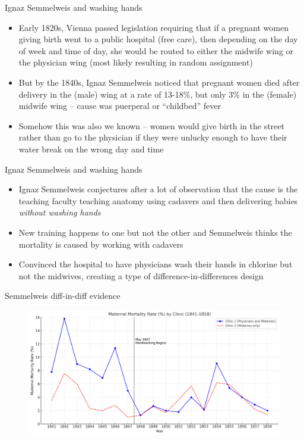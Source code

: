 \documentclass{beamer}
\begin{document}
\begin{frame}{Ignaz Semmelweis and washing hands}

\begin{itemize}
\item Early 1820s, Vienna passed legislation requiring that if a pregnant women giving birth went to a public hospital (free care), then depending on the day of week and time of day, she would be routed to either the midwife wing or the physician wing (most likely resulting in random assignment)
\item But by the 1840s, Ignaz Semmelweis noticed that pregnant women died after delivery in the (male) wing at a rate of 13-18\%, but only 3\% in the (female) midwife wing -- cause was puerperal or “childbed” fever
\item Somehow this was also we known -- women would give birth in the street rather than go to the physician if they were unlucky enough to have their water break on the wrong day and time
\end{itemize}

\end{frame}

\begin{frame}{Ignaz Semmelweis and washing hands}

\begin{itemize}
\item Ignaz Semmelweis conjectures after a lot of observation that the cause is the teaching faculty teaching anatomy using cadavers and then delivering babies \emph{without washing hands}
\item New training happens to one but not the other and Semmelweis thinks the mortality is caused by working with cadavers
\item Convinced the hospital to have physicians wash their hands in chlorine but not the midwives, creating a type of difference-in-differences design
\end{itemize}

\end{frame}

\begin{frame}{Semmelweis diff-in-diff evidence}

	\begin{figure}
	\includegraphics[scale=0.4]{./lecture_includes/semmelweis_graphic.png}
	\end{figure}


\end{frame}
\end{document}
